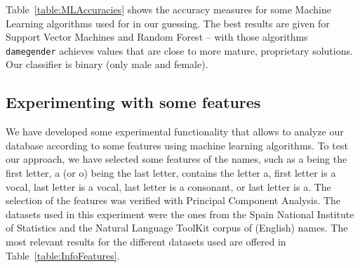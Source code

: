 \documentclass[a4paper]{article}
\begin{document}
Table~\ref{table:MLAccuracies} shows the accuracy measures for some Machine Learning algorithms used for in our guessing. 
The best results are given for Support Vector Machines and Random Forest -- with those algorithms \texttt{damegender} achieves values that are close to more mature, proprietary solutions.
Our classifier is binary (only male and female).

\subsection{Experimenting with some features}

We have developed some experimental functionality that allows to analyze our database according to some features using machine learning algorithms.
To test our approach, we have selected some features of the names, such as a being the first letter, a (or o) being the last letter, contains the letter a, first letter is a vocal, last letter is a vocal, last letter is a consonant, or last letter is a. 
The selection of the features was verified with Principal Component Analysis.
The datasets used in this experiment were the ones from the Spain National Institute of Statistics and the Natural Language
ToolKit corpus of (English) names.
The most relevant results for the different datasets used are offered in Table~\ref{table:InfoFeatures}.
\end{document}
